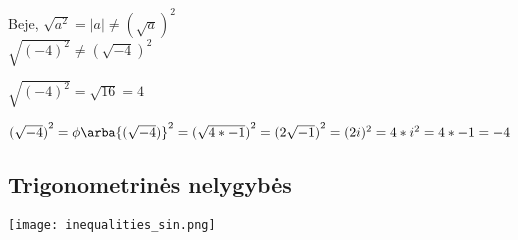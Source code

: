 Beje, $\sqrt{a^2} = |a| \ne {(\sqrt{a})}^2$ \\

$\sqrt{(-4)^2} \ne {(\sqrt{-4})}^2$

$\sqrt{(-4)^2} = \sqrt{16} = 4$

${(\sqrt{-4})}^2 = \phi \arba {(\sqrt{-4})}^2 = {(\sqrt{4 * -1})}^2 = {(2\sqrt{-1})}^2 = (2i)^2 = 4 * i^2 = 4 * -1 = -4$


\subsection{Trigonometrinės nelygybės}

\texttt{[image: inequalities\_sin.png]}
